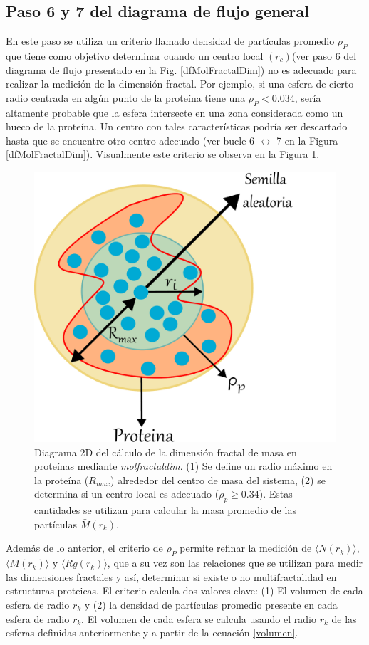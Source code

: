 	 
	 
	 \subsection{Paso 6 y 7 del diagrama de flujo general}
	 
	 En este paso se utiliza un criterio llamado densidad de partículas promedio $\rho_{P}$ que tiene como objetivo determinar cuando un centro local $(r_c)$(ver paso 6 del diagrama de flujo presentado en la Fig. \ref{dfMolFractalDim}) no es adecuado para realizar la medici\'{o}n de la dimensi\'{o}n fractal. Por ejemplo, si una esfera de cierto radio centrada en alg\'{u}n punto de la proteína tiene una $\rho_{P} < 0.034$, ser\'{i}a altamente probable que la esfera intersecte en una zona considerada como un hueco de la prote\'{i}na. Un centro con tales caracter\'{i}sticas podr\'{i}a ser descartado hasta que se encuentre otro centro adecuado (ver bucle 6 $\longleftrightarrow$ 7 en la Figura \ref{dfMolFractalDim}). Visualmente este criterio se observa en la Figura \ref{fig:centrob}. 
	 
	 	\begin{figure}[H]
	 	\centering
	 	\includegraphics[width=0.5\linewidth]{graphs/centrob4.pdf}
	 	\caption{Diagrama 2D del c\'{a}lculo de la dimensi\'{o}n fractal de masa en prote\'{i}nas mediante \textit{molfractaldim}. (1) Se define un radio m\'{a}ximo en la prote\'{i}na ($R_{max}$) alrededor del centro de masa del sistema, (2) se determina si un centro local es adecuado ($\rho_{p} \geq 0.34$). Estas cantidades se utilizan para calcular la masa promedio de las part\'{i}culas $\bar{M}(r_k)$.}
	 	\label{fig:centrob}
	 \end{figure}
	 
	  Además de lo anterior, el criterio de \(\rho_{P}\) permite refinar la medici\'{o}n de $\langle N(r_k) \rangle$, $\langle M(r_k) \rangle$ y $\langle Rg(r_k) \rangle$, que a su vez son las relaciones que se utilizan para medir las dimensiones fractales y as\'{i}, determinar si existe o no multifractalidad en estructuras proteicas. El criterio calcula dos valores clave: (1) El volumen de cada esfera de radio $r_k$ y (2) la densidad de partículas promedio presente en cada esfera de radio $r_k$. El volumen de cada esfera se calcula usando el radio \(r_k\) de las esferas definidas anteriormente y a partir de la ecuaci\'{o}n \ref{volumen}.\\
	 
